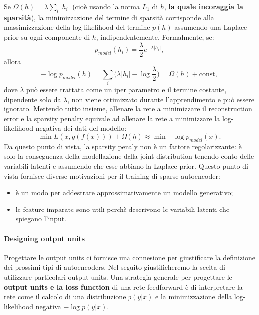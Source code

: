 Se $\Omega(h)=\lambda\sum_i|h_i|$ (cioè usando la norma $L_1$ di $h$, \textbf{la quale incoraggia la 
sparsità}), la minimizzazione del termine di sparsità corrisponde alla massimizzazione della log-likelihood 
del termine $p(h)$ assumendo una Laplace prior su ogni componente di $h$, indipendentemente. Formalmente, se:
\begin{equation}
  p_{model}(h_i)=\frac{\lambda}{2}e^{-\lambda|h_i|},
\end{equation}
allora
\begin{equation}
  -\log{p_{model}(h)}=\sum_i\Big(\lambda|h_i|-\log{\frac{\lambda}{2}} \Big) = \Omega(h)+\text{const},
\end{equation}
dove $\lambda$ può essere trattata come un iper parametro e il termine costante, dipendente solo da $\lambda$,
non viene ottimizzato durante l'apprendimento e può essere ignorato.
\newline
\newline
Mettendo tutto insieme, allenare la rete a minimizzare il reconstruction error e la sparsity penalty equivale
ad allenare la rete a minimizzare la log-likelihood negativa dei dati del modello:
\begin{equation}
  \min{L(x,g(f(x)))}+\Omega(h)\approx\min{-\log{p_{model}(x)}}.
\end{equation}
Da questo punto di vista, la sparsity penaly non è un fattore regolarizzante: è solo la conseguenza 
della modellazione della joint distribution tenendo conto delle variabili latenti e assumendo che esse 
abbiano la Laplace prior.
\newline
Questo punto di vista fornisce diverse motivazioni per il training di sparse autoencoder:
\begin{itemize}
  \item è un modo per addestrare approssimativamente un modello generativo;
  \item le feature imparate sono utili perchè descrivono le variabili latenti che spiegano l'input.
\end{itemize}
\paragraph{Designing output units}
Progettare le output units ci fornisce una connesione per giustificare la definizione dei
prossimi tipi di autoencoders. Nel seguito giustificheremo la scelta di utilizzare particolari output units.
\newline
\newline
Una strategia generale per progettare le \textbf{output units e la loss function} di una rete feedforward è di
interpretare la rete come il calcolo di una distribuzione $p(y|x)$ e la minimizzazione della log-likelihood
negativa $-\log{p(y|x)}$.



